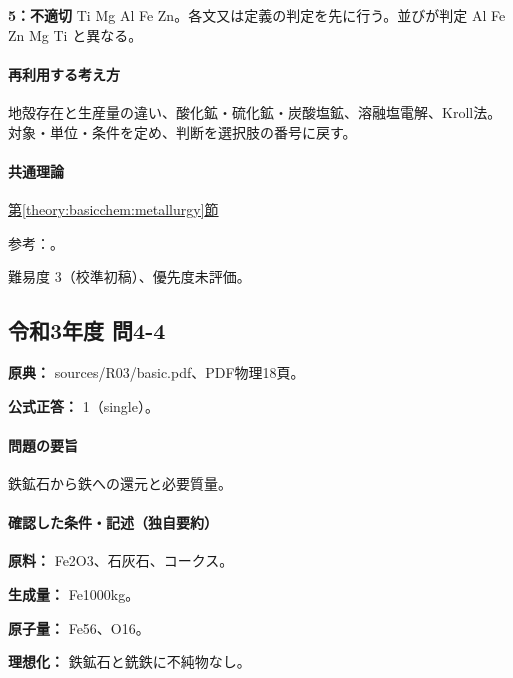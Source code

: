 \noindent\textbf{5：不適切} Ti Mg Al Fe Zn。各文又は定義の判定を先に行う。並びが判定 Al Fe Zn Mg Ti と異なる。\par

\paragraph{再利用する考え方} 地殻存在と生産量の違い、酸化鉱・硫化鉱・炭酸塩鉱、溶融塩電解、Kroll法。 対象・単位・条件を定め、判断を選択肢の番号に戻す。

\paragraph{共通理論} \hyperref[theory:basicchem:metallurgy]{第\ref*{theory:basicchem:metallurgy}節}

\par 参考：\cite{chem55_kroll,chem55_crust}。

\par 難易度 3（校準初稿）、優先度未評価。

\subsection{令和3年度 問4-4}
\label{q:r03-reg-basic-4-4}

\noindent\textbf{原典：} sources/R03/basic.pdf、PDF物理18頁。

\textbf{公式正答：} 1（single）。

\paragraph{問題の要旨} 鉄鉱石から鉄への還元と必要質量。

\paragraph{確認した条件・記述（独自要約）}\mbox{}\par

\noindent\textbf{原料：} Fe2O3、石灰石、コークス。\par

\noindent\textbf{生成量：} Fe1000kg。\par

\noindent\textbf{原子量：} Fe56、O16。\par

\noindent\textbf{理想化：} 鉄鉱石と銑鉄に不純物なし。\par

